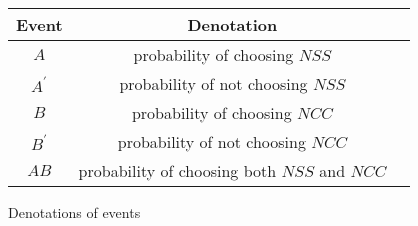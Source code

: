 


    
    \begin{tabular}{|c|c|c|}
    \hline
    Event & Denotation\\
        \hline 
        $A$ & probability of choosing $NSS$ \\
        \hline
        $A^\prime$ & probability of not choosing $NSS$\\
        \hline
       $B$ & probability of choosing $NCC$ \\
        \hline
       $B^\prime$ & probability of not choosing $NCC$ \\
        \hline
        $AB$ & probability of choosing both $NSS$ and $NCC$\\
        \hline
    \end{tabular}
    \caption{Denotations of events}
    



